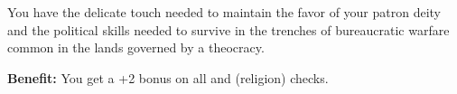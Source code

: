 
You have the delicate touch needed to maintain the favor of your patron deity and the political skills needed to survive in the trenches of bureaucratic warfare common in the lands governed by a theocracy.

\textbf{Benefit:} You get a +2 bonus on all  and  (religion) checks.